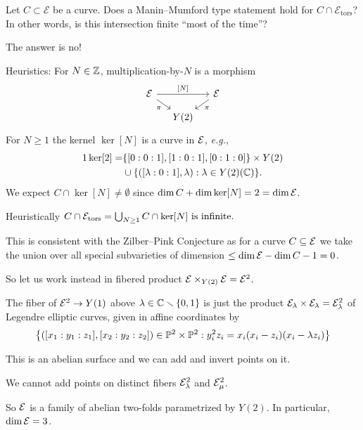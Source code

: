 \documentclass{beamer}
\begin{document}
\begin{frame}
  Let $C\subset \mathcal{E}$ be a curve. Does a
  Manin--Mumford type statement hold for $C\cap
  \mathcal{E}_{\mathrm{tors}}$? In other words, is this intersection
  finite ``most of the time''?

  The answer is \alert{no}! 

  Heuristics: For $N\in{\mathbb{Z}}$,  multiplication-by-$N$ is a
  morphism
  \begin{equation*}
    \begin{tikzcd}[ampersand replacement=\&,column sep=small, row sep=small] 
    \cE \arrow{dr}[swap]{\pi}  \arrow{rr}{[N]} \&  \& \cE\arrow{dl}{\pi}  \\
     \& Y(2)   
  \end{tikzcd}  
  \end{equation*}
  For $N\ge 1$ the kernel  $\ker[N]$ is a curve
  in ${\mathcal E}$, \textit{e.g.},
  \begin{alignat*}1
    \ker[2] = &\{[0:0:1],[1:0:1],[0:1:0]\}\times Y(2)\\
    &\cup
    \{([\lambda:0:1],\lambda) : \lambda \in Y(2)(\IC)\}.
  \end{alignat*}
  We expect $C\cap \ker[N]\not=\emptyset$
  since $\dim C + \dim \ker[N] = 2 = \dim {\mathcal E}$.
  
  \alert{Heuristically} $C\cap {\mathcal E}_{\mathrm{tors}} = \bigcup_{N\ge 1}C\cap \ker[N]
  \text{ is infinite.}$
\end{frame}

\begin{frame}
  This is consistent with the Zilber--Pink Conjecture as for a curve
  $C\subseteq {\mathcal E}$ we take the union over all special subvarieties of
  dimension $\le \dim{\mathcal E}-\dim C - 1 = 0$. 

  So let us work instead in  \alert{fibered product}
  ${\mathcal E}\times_{Y(2)}{\mathcal E}={\mathcal E}^2$.

  \begin{example}
    The fiber of ${\mathcal E}^2\rightarrow Y(1)$ above  $\lambda\in
    {\mathbb{C}}\smallsetminus\{0,1\}$
    is just the product ${\mathcal E}_\lambda\times {\mathcal E}_\lambda={\mathcal E}^2_\lambda$ of Legendre
    elliptic curves, given in affine coordinates by
    \begin{equation*}
      \bigl\{([x_1:y_1:z_1],[x_2:y_2:z_2]) \in{\mathbb{P}}^2\times{\mathbb{P}}^2 : y_i^2z_i =
      x_i(x_i-z_i)(x_i-\lambda z_i)\bigr\}      
    \end{equation*}

    This is an abelian surface and we can add and invert points on it.

    We \alert{cannot} add points on distinct fibers ${\mathcal E}^2_{\lambda}$
    and ${\mathcal E}^2_\mu$.

    So ${\mathcal E}$ is a family of abelian two-folds parametrized by $Y(2)$.
    In particular, $\dim {\mathcal E} = 3$. 
  \end{example}
\end{frame}
\end{document}
